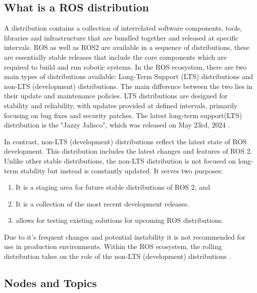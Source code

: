 \subsection{What is a ROS distribution}

A distribution contains a collection of interrelated software components, tools, libraries and infrastructure that are bundled together and released at specific intervals. 
ROS as well as ROS2 are available in a sequence of distributions, these are essentially stable releases that include the core components which are required to build and run robotic systems. 
In the ROS ecosystem, there are two main types of distributions available: Long-Term Support (LTS) distributions and non-LTS (development) distributions. The main difference between the two lies in their update and maintenance policies.
LTS distributions are designed for stability and reliability, with updates provided at defined intervals, primarily focusing on bug fixes and security patches. The latest long-term support(LTS) distribution is the "Jazzy Jalisco", which was released on May 23rd, 2024 \autocite{openroboticsJazzyJaliscoJazzy}.

In contrast, non-LTS (development) distributions reflect the latest state of ROS development. This distribution includes the latest changes and features of ROS 2. Unlike other stable distributions, the non-LTS distribution is not focused on long-term stability but instead is constantly updated. It serves two purposes:

\begin{enumerate}
    \item It is a staging area for future stable distributions of ROS 2, and
    \item It is a collection of the most recent development releases.
    \item allows for testing existing solutions for upcoming ROS distributions.
\end{enumerate}

Due to it's frequent changes and potential instability it is not recommended for use in production environments. Within the ROS ecosystem, the rolling distribution takes on the role of the non-LTS (development) distributions \autocite{openroboticsDistributionsROS2a}.

\subsection{Nodes and Topics}

